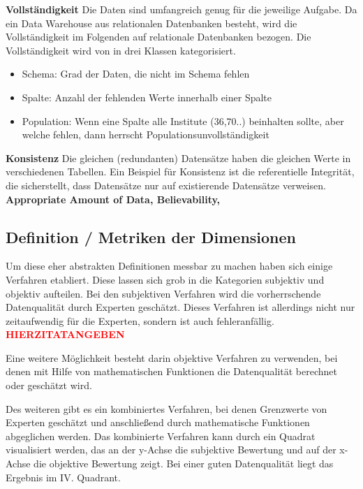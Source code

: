 \textbf{Vollständigkeit}
Die Daten sind umfangreich genug für die jeweilige Aufgabe. \cite{wang1996} 
Da ein Data Warehouse aus relationalen Datenbanken besteht, wird die Vollständigkeit im Folgenden auf relationale Datenbanken bezogen.
Die Vollständigkeit wird von \cite{pipino2002} in drei Klassen kategorisiert.
\begin{itemize}
 \item Schema: Grad der Daten, die nicht im Schema fehlen
 \item Spalte: Anzahl der fehlenden Werte innerhalb einer Spalte
 \item Population: Wenn eine Spalte alle Institute (36,70..) beinhalten sollte, aber welche fehlen, dann herrscht Populationsunvollständigkeit
\end{itemize}
\textbf{Konsistenz}
Die gleichen (redundanten) Datensätze haben die gleichen Werte in verschiedenen Tabellen. 
Ein Beispiel für Konsistenz ist die referentielle Integrität, die sicherstellt, dass Datensätze nur auf existierende Datensätze verweisen.
\\ \textbf{Appropriate Amount of Data, Believability, }


\subsection{Definition / Metriken der Dimensionen}
Um diese eher abstrakten Definitionen messbar zu machen haben sich einige Verfahren etabliert.
Diese lassen sich grob in die Kategorien subjektiv und objektiv aufteilen. \cite{pipino2002}
Bei den subjektiven Verfahren wird die vorherrschende Datenqualität durch Experten geschätzt. 
Dieses Verfahren ist allerdings nicht nur zeitaufwendig für die Experten, sondern ist auch fehleranfällig. \textcolor{red}{\textbf{HIERZITATANGEBEN}} \cite{}

Eine weitere Möglichkeit besteht darin objektive Verfahren zu verwenden, bei denen mit Hilfe von mathematischen Funktionen die Datenqualität berechnet oder geschätzt wird. 

Des weiteren gibt es ein kombiniertes Verfahren, bei denen Grenzwerte von Experten geschätzt und anschließend durch mathematische Funktionen abgeglichen werden. 
Das kombinierte Verfahren kann durch ein Quadrat visualisiert werden, das an der y-Achse die subjektive Bewertung und auf der x-Achse die objektive Bewertung zeigt. 
Bei einer guten Datenqualität liegt das Ergebnis im IV. Quadrant. \cite{pipino2002}

